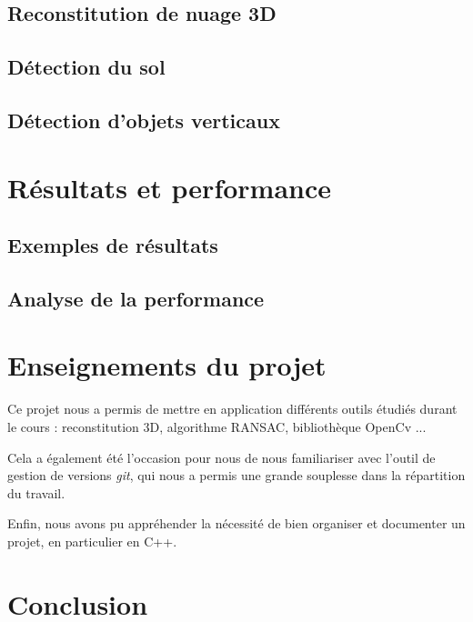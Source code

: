 \documentclass[titlepage,11pt,a4paper]{article}
\begin{document}
\subsection{Reconstitution de nuage 3D}
\subsection{Détection du sol}
\subsection{Détection d'objets verticaux}


\newpage \section{Résultats et performance}
\subsection{Exemples de résultats}
\subsection{Analyse de la performance}



\newpage \section{Enseignements du projet}
\par Ce projet nous a permis de mettre en application différents outils étudiés durant le cours : reconstitution 3D, algorithme RANSAC, bibliothèque OpenCv ...
\par Cela a également été l'occasion pour nous de nous familiariser avec l'outil de gestion de versions \emph{git}, qui nous a permis une grande souplesse dans la répartition du travail.
\par Enfin, nous avons pu appréhender la nécessité de bien organiser et documenter un projet, en particulier en C++.


\newpage \section{Conclusion}
\end{document}
